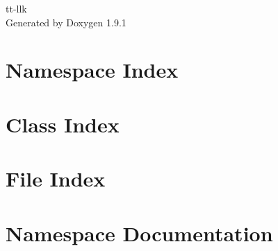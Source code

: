 \let\mypdfximage\pdfximage\def\pdfximage{\immediate\mypdfximage}\documentclass[twoside]{book}
\newcommand{\+}{\discretionary{\mbox{\scriptsize$\hookleftarrow$}}{}{}}
\newcommand{\clearemptydoublepage}{%
  \newpage{\pagestyle{empty}\cleardoublepage}%
}
\begin{document}
\raggedbottom

\hypersetup{pageanchor=false,
             bookmarksnumbered=true,
             pdfencoding=unicode
            }
\begin{titlepage}
\vspace*{7cm}
\begin{center}%
{\Large tt-\/llk }\\
\vspace*{1cm}
{\large Generated by Doxygen 1.9.1}\\
\end{center}
\end{titlepage}
\clearemptydoublepage
{}
\tableofcontents
\clearemptydoublepage
{}
\hypersetup{pageanchor=true}

\chapter{Namespace Index}

\chapter{Class Index}

\chapter{File Index}

\chapter{Namespace Documentation}







\end{document}
